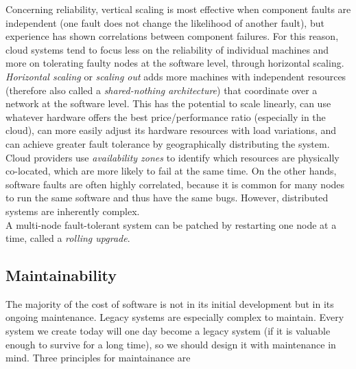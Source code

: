 \documentclass[table, xcdraw]{article}%
\begin{document}
Concerning reliability, vertical scaling is most effective when component faults are independent (one fault does not change the likelihood of another fault), but experience has shown correlations between component failures. For this reason, cloud systems tend to focus less on the reliability of individual machines and more on tolerating faulty nodes at the software level, through horizontal scaling.\\
\textit{Horizontal scaling} or \textit{scaling out} adds more machines with independent resources (therefore also called a \textit{shared-nothing architecture}) that coordinate over a network at the software level. This has the potential to scale linearly, can use whatever hardware offers the best price/performance ratio (especially in the cloud), can more easily adjust its hardware resources with load variations, and can achieve greater fault tolerance by geographically distributing the system. Cloud providers use \textit{availability zones} to identify which resources are physically co-located, which are more likely to fail at the same time. On the other hands, software faults are often highly correlated, because it is common for many nodes to run the same software and thus have the same bugs. However, distributed systems are inherently complex.\\
A multi-node fault-tolerant system can be patched by restarting one node at a time, called a \textit{rolling upgrade}.

\subsection{Maintainability}

The majority of the cost of software is not in its initial development but in its ongoing maintenance. Legacy systems are especially complex to maintain. Every system we create today will one day become a legacy system (if it is valuable enough to survive for a long time), so we should design it with maintenance in mind. Three principles for maintainance are
\end{document}
